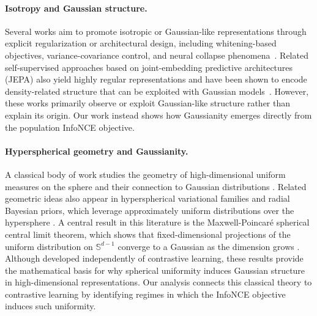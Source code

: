 \documentclass{article}
\begin{document}
\paragraph{Isotropy and Gaussian structure.}
Several works aim to promote isotropic or Gaussian-like representations through explicit regularization or architectural design, including whitening-based objectives, variance-covariance control, and neural collapse phenomena~\citep{ermolov2021whitening,papyan2020prevalence,bardes2022vicregl}.
Related self-supervised approaches based on joint-embedding predictive architectures (JEPA) also yield highly regular representations and have been shown to encode density-related structure that can be exploited with Gaussian models~\citep{assran2023self,bardes2024revisiting,balestriero2025gaussian, balestriero2025lejepa}.
However, these works primarily observe or exploit Gaussian-like structure rather than explain its origin. Our work instead shows how Gaussianity emerges directly from the population InfoNCE objective.

\paragraph{Hyperspherical geometry and Gaussianity.}
A classical body of work studies the geometry of high-dimensional uniform measures on the sphere and their connection to Gaussian distributions \citep{vershynin2018high,wegner2021lecture}.
Related geometric ideas also appear in hyperspherical variational families and radial Bayesian priors, which leverage approximately uniform distributions over the hypersphere \citep{davidson2018hyperspherical,farquhar2020radial}.
A central result in this literature is the Maxwell-Poincar\'e spherical central limit theorem, which shows that fixed-dimensional projections of the uniform distribution on $\mathbb{S}^{d-1}$ converge to a Gaussian as the dimension grows \citep{maxwell1860ii,poincare1912calcul,diaconis1987dozen}.
Although developed independently of contrastive learning, these results provide the mathematical basis for why spherical uniformity induces Gaussian structure in high-dimensional representations. Our analysis connects this classical theory to contrastive learning by identifying regimes in which the InfoNCE objective induces such uniformity.
\end{document}
